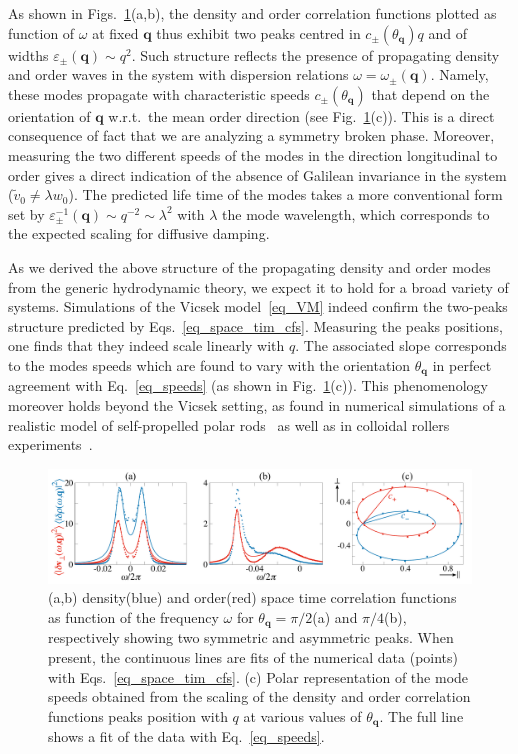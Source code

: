 As shown in Figs.~\ref{figmodes}(a,b), the density and order correlation functions plotted as function of $\omega$ at fixed $\bm q$ thus exhibit two peaks centred in $c_\pm(\theta_{\bm q})q$ and of widths $\varepsilon_\pm(\bm q)\sim q^2$.
Such structure reflects the presence of propagating density and order waves in the system with dispersion relations $\omega = \omega_\pm(\bm q)$.
Namely, these modes propagate with characteristic speeds $c_\pm(\theta_{\bm q})$ that depend on the orientation of $\bm q$ w.r.t.\ the mean order direction (see Fig.~\ref{figmodes}(c)). 
This is a direct consequence of fact that we are analyzing a symmetry broken phase.
Moreover, measuring the two different speeds of the modes in the direction longitudinal to order gives 
a direct indication of the absence of Galilean invariance in the system ($\tilde{v}_0 \ne \lambda w_0$).
The predicted life time of the modes takes a more conventional form set by $\varepsilon^{-1}_\pm(\bm q)\sim q^{-2} \sim \lambda^2$ with $\lambda$ the mode wavelength, which corresponds to the expected scaling for diffusive damping.

As we derived the above structure of the propagating density and order modes from the generic hydrodynamic theory, 
we expect it to hold for a broad variety of systems.
Simulations of the Vicsek model~\eqref{eq_VM} indeed confirm the two-peaks structure predicted by Eqs.~\eqref{eq_space_tim_cfs}.
Measuring the peaks positions, one finds that they indeed scale linearly with $q$. 
The associated slope corresponds to the modes speeds which are found to vary with the orientation $\theta_{\bm q}$ 
in perfect agreement with Eq.~\eqref{eq_speeds} (as shown in Fig.~\ref{figmodes}(c)).
This phenomenology moreover holds beyond the Vicsek setting, as found in numerical simulations of a realistic model of self-propelled polar rods~\cite{Soni2020}
as well as in colloidal rollers experiments~\cite{geyer2018sounds}.

\begin{figure}[t!]
	\includegraphics[width=\textwidth]{Figures/figmodes.pdf}
	\caption{(a,b) density(blue) and order(red) space time correlation functions as function of the frequency $\omega$ for $\theta_{\bm q} = \pi/2$(a) and $\pi/4$(b),
	respectively showing two symmetric and asymmetric peaks.
	When present, the continuous lines are fits of the numerical data (points) with Eqs.~\eqref{eq_space_tim_cfs}.
	(c) Polar representation of the mode speeds obtained from the scaling of the density and order correlation functions peaks position with $q$ at various values of $\theta_{\bm q}$. 
	The full line shows a fit of the data with Eq.~\eqref{eq_speeds}.}
	\label{figmodes}
\end{figure}

